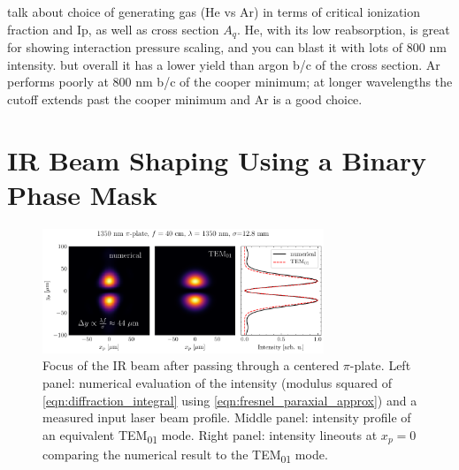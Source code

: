 talk about choice of generating gas (He vs Ar) in terms of critical ionization fraction and Ip, as well as cross section $A_q$. He, with its low reabsorption, is great for showing interaction pressure scaling, and you can blast it with lots of 800 nm intensity. but overall it has a lower yield than argon b/c of the cross section. Ar performs poorly at 800 nm b/c of the cooper minimum; at longer wavelengths the cutoff extends past the cooper minimum and Ar is a good choice.

\section{IR Beam Shaping Using a Binary Phase Mask}
\label{sec:pi-plate-math}

\begin{figure}
	\centering
	\includegraphics[width=0.75\textwidth]{figures/chap1/pi_plate_focus_LP_TEM_1350nm.pdf}
	\caption{Focus of the IR beam after passing through a centered $\pi$-plate. Left panel: numerical evaluation of the intensity (modulus squared of \cref{eqn:diffraction_integral} using \cref{eqn:fresnel_paraxial_approx}) and a measured input laser beam profile. Middle panel: intensity profile of an equivalent TEM\textsubscript{01} mode. Right panel: intensity lineouts at $x_p = 0$ comparing the numerical result to the TEM\textsubscript{01} mode.}
	\label{fig:pi_plate_focus_sim}
\end{figure}


